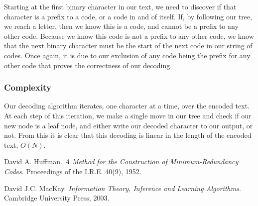 \documentclass[paper=a4, fontsize=10pt]{article} %
\numberwithin{equation}{section} %
\numberwithin{figure}{section} %
\numberwithin{table}{section} %
\begin{document}
Starting at the first binary character in our text, we need to discover if that character is a prefix to a code, or a code in and of itself. If, by following our tree, we reach a letter, then we know this is a code, and cannot be a prefix to any other code. Because we know this code is not a prefix to any other code, we know that the next binary character must be the start of the next code in our string of codes. Once again, it is due to our exclusion of any code being the prefix for any other code that proves the correctness of our decoding.

\subsubsection{Complexity}

Our decoding algorithm iterates, one character at a time, over the encoded text. At each step of this iteration, we make a single move in our tree and check if our new node is a leaf node, and either write our decoded character to our output, or not. From this it is clear that this decoding is linear in the length of the encoded text, $O(N)$.



\pagebreak

\begin{thebibliography}{9}
David A. Huffman.
\textit{A Method for the Construction of Minimum-Redundancy Codes}.
Proceedings of the I.R.E. 40(9), 1952.

David J.C. MacKay.
\textit{Information Theory, Inference and Learning Algorithms}.
Cambridge University Press, 2003.
\end{thebibliography}
\end{document}
